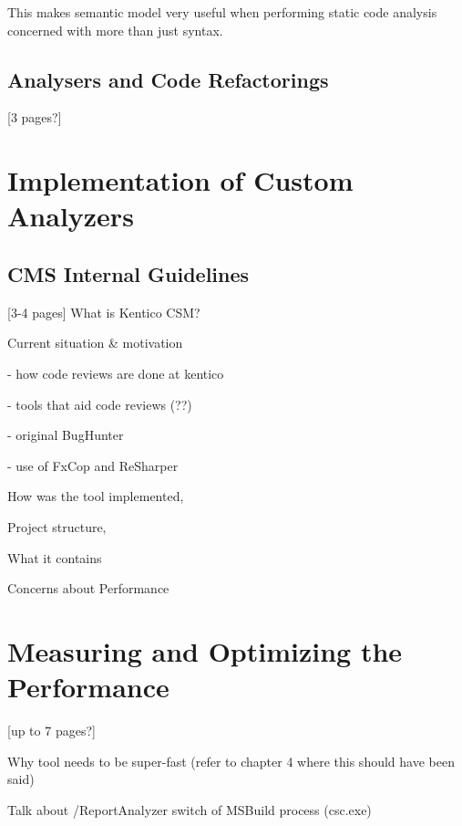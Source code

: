 \documentclass[
  digital, %
  table,   %
  lof,     %
  lot,     %
  oneside,
]{fithesis3}
\begin{document}
This makes semantic model very useful when performing static code analysis concerned with more than just syntax.
 
\pagebreak
\section{Analysers and Code Refactorings}
[3 pages?]
  

\chapter{Implementation of Custom Analyzers}
\label{chap:custom-roslyn-analyzers}
\section{CMS Internal Guidelines}
[3-4 pages]
What is Kentico CSM?

Current situation \& motivation

- how code reviews are done at kentico

- tools that aid code reviews (??)

  - original BugHunter

  - use of FxCop and ReSharper

\noindent
[5-7 pages]
How was the tool implemented, 

Project structure,

What it contains

Concerns about Performance

\chapter{Measuring and Optimizing the Performance}
[up to 7 pages?]

Why tool needs to be super-fast (refer to chapter 4 where this should have been said)

Talk about /ReportAnalyzer switch of MSBuild process (csc.exe)
\end{document}
